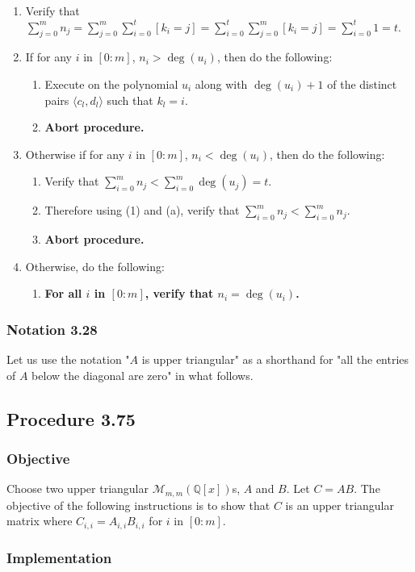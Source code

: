 \documentclass[twocolumn]{article}
\newcommand{\notation}[1]{\subsubsection*{Notation #1}}
\newcommand{\procedure}[2][]{\subsection*{Procedure #2 \ifthenelse{\equal{#1}{}}{}{(#1)}}\label{sec:procedure #2}}
\newcommand{\objective}{\subsubsection*{Objective}}
\newcommand{\implementation}{\subsubsection*{Implementation}}
\newcommand{\procedurehr}[2][]{\hyperref[sec:procedure #2]{\ifthenelse{\equal{#1}{}}{procedure #2}{#1}}}
\begin{document}
				\begin{enumerate}
					\item Verify that $\sum_{j=0}^m n_j=\sum_{j=0}^m\sum_{i=0}^t [k_i=j]=\sum_{i=0}^t\sum_{j=0}^m [k_i=j]=\sum_{i=0}^t 1=t$.
					\item If for any $i$ in $[0:m]$, $n_i>\deg(u_i)$, then do the following:
					\begin{enumerate}
						\item Execute \procedurehr{2.03} on the polynomial $u_i$ along with $\deg(u_i)+1$ of the distinct pairs $\langle c_l,d_l\rangle$ such that $k_l=i$.
						\item \textbf{Abort procedure.}
					\end{enumerate}
					\item Otherwise if for any $i$ in $[0:m]$, $n_i<\deg(u_i)$, then do the following:
					\begin{enumerate}
						\item Verify that $\sum_{i=0}^m n_j<\sum_{i=0}^m \deg(u_j)=t$.
						\item Therefore using (1) and (a), verify that $\sum_{i=0}^m n_j<\sum_{i=0}^m n_j$.
						\item \textbf{Abort procedure.}
					\end{enumerate}
					\item Otherwise, do the following:
					\begin{enumerate}
						\item \textbf{For all $i$ in $[0:m]$, verify that $n_i=\deg(u_i)$.}
					\end{enumerate}
				\end{enumerate}
		\notation{3.28}
			Let us use the notation "$A$ is upper triangular" as a shorthand for "all the entries of $A$ below the diagonal are zero" in what follows. 
		\procedure{3.75}
			\objective
				Choose two upper triangular $\mathcal{M}_{m,m}(\mathbb{Q}[x])$s, $A$ and $B$. Let $C=AB$. The objective of the following instructions is to show that $C$ is an upper triangular matrix where $C_{i,i}=A_{i,i}B_{i,i}$ for $i$ in $[0:m]$.
			\implementation
\end{document}
